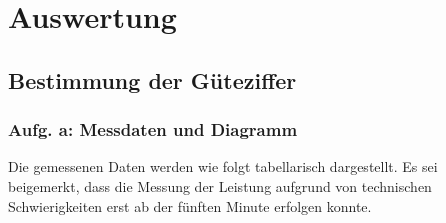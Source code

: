 \newpage
\section{Auswertung}
\label{sec:Auswertung}

\subsection{Bestimmung der Güteziffer}

\subsubsection{Aufg. a: Messdaten und Diagramm}

Die gemessenen Daten werden wie folgt tabellarisch dargestellt. Es sei beigemerkt, dass die Messung der Leistung aufgrund
von technischen Schwierigkeiten erst ab der fünften Minute erfolgen konnte.

